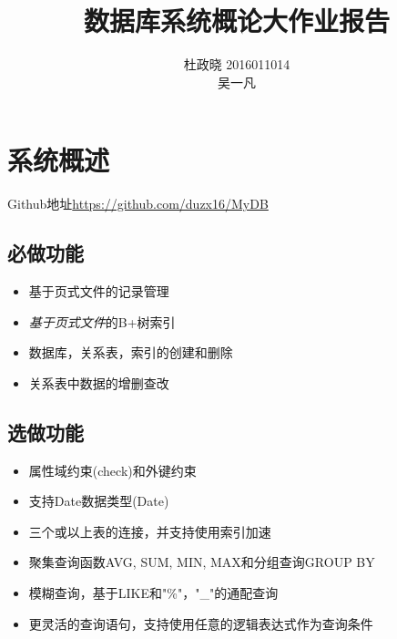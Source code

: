 \documentclass[11pt,UTF8]{report}
\title{数据库系统概论大作业报告}
\author{杜政晓 2016011014\\
吴一凡 }
\begin{document}
\maketitle

\section{系统概述}
Github地址\url{https://github.com/duzx16/MyDB}
\subsection{必做功能}
\begin{itemize}
	\item 基于页式文件的记录管理
	\item \emph{基于页式文件}的B+树索引
	\item 数据库，关系表，索引的创建和删除
	\item 关系表中数据的增删查改
\end{itemize}

\subsection{选做功能}
\begin{itemize}
	\item 属性域约束(check)和外键约束
	\item 支持Date数据类型(Date)
	\item 三个或以上表的连接，并支持使用索引加速
	\item 聚集查询函数AVG, SUM, MIN, MAX和分组查询GROUP BY
	\item 模糊查询，基于LIKE和"\%"，"\_"的通配查询
	\item 更灵活的查询语句，支持使用任意的逻辑表达式作为查询条件
\end{itemize}
\end{document}
